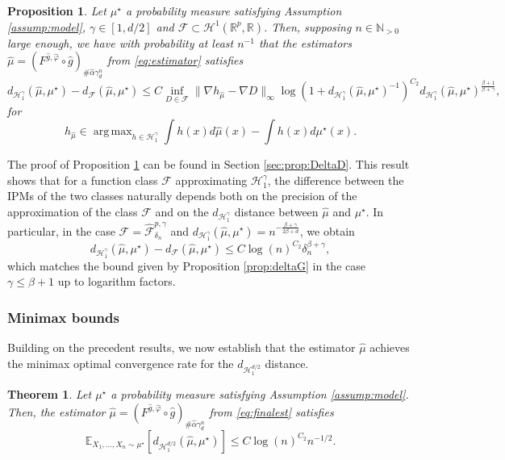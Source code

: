 \documentclass[10pt]{article}
\newtheorem{theorem}{Theorem}
\newtheorem{proposition}{Proposition}
\DeclareMathOperator*{\argmax}{arg\,max}
\begin{document}
\begin{proposition}\label{prop:DeltaD} Let $\mu^\star$ a probability measure satisfying Assumption \ref{assump:model}, $\gamma\in [1,d/2]$ and $\mathcal{F}\subset \mathcal{H}^1(\mathbb{R}^p,\mathbb{R})$. Then, supposing $n\in \mathbb{N}_{>0}$ large enough, we have with probability at least $n^{-1}$ that the estimators $\hat{\mu}=(F^{\hat{g},\hat{\varphi}}\circ \hat{g})_{\# \hat{\alpha}\gamma_d^n}$ from \eqref{eq:estimator} satisfies
$$d_{\mathcal{H}_1^{\gamma}}(\hat{\mu},\mu^\star)-d_{\mathcal{F}}(\hat{\mu},\mu^\star)\leq C\inf_{D\in \mathcal{F}}\|\nabla h_{\hat{\mu}}-\nabla D\|_\infty\log\left(1+d_{\mathcal{H}^{\gamma}_1}(\hat{\mu},\mu^\star)^{-1}\right)^{C_2} d_{\mathcal{H}^{\gamma}_1}(\hat{\mu},\mu^\star)^{\frac{\beta+1}{\beta+\gamma}},$$
for 
$$h_{\hat{\mu}} \in \argmax_{h\in \mathcal{H}^{\gamma}_1} \int h(x)d\hat{\mu}(x)-\int h(x)d\mu^\star(x).$$
\end{proposition}
The proof of Proposition \ref{prop:DeltaD} can be found in Section \ref{sec:prop:DeltaD}. This result shows that for a function class $\mathcal{F}$ approximating $\mathcal{H}_1^{\gamma}$, the difference between the IPMs of the two classes naturally depends both on the precision of the approximation of the class $\mathcal{F}$ and on the $d_{\mathcal{H}^{\gamma}_1}$ distance between $\hat{\mu}$ and $\mu^\star$. In particular, in the case $\mathcal{F}=\hat{\mathcal{F}}^{p,\gamma}_{\delta_n}$ and $d_{\mathcal{H}^{\gamma}_1}(\hat{\mu},\mu^\star)=n^{-\frac{\beta+\gamma}{2\beta+d}}$, we obtain 
$$d_{\mathcal{H}_1^{\gamma}}(\hat{\mu},\mu^\star)-d_{\mathcal{F}}(\hat{\mu},\mu^\star)\leq C\log(n)^{C_2} \delta_n^{\beta+\gamma},$$
which matches the bound given by Proposition \ref{prop:deltaG} in the case $\gamma\leq \beta+1$ up to logarithm factors.

\subsubsection{Minimax bounds}
Building on the precedent results, we now establish that the estimator \( \hat{\mu} \) achieves the minimax optimal convergence rate for the \( d_{\mathcal{H}^{d/2}_1} \) distance.


\begin{theorem}\label{theo:boundonddsur2}  Let $\mu^\star$ a probability measure satisfying Assumption \ref{assump:model}. Then, the estimator $\hat{\mu}=(F^{\hat{g},\hat{\varphi}}\circ \hat{g})_{\# \hat{\alpha}\gamma_d^n}$ from \eqref{eq:finalest} satisfies
   $$\mathbb{E}_{X_1,...,X_n\sim \mu^\star}[d_{\mathcal{H}^{d/2}_1}(\hat{\mu},\mu^\star)]\leq C \log(n)^{C_2} n^{-1/2}.$$
\end{theorem}
\end{document}

